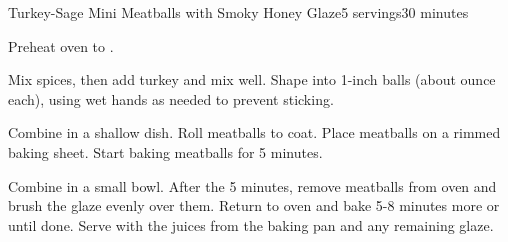 \documentclass[../Cookbook.tex]{subfiles}
\begin{document}
\begin{recipe}{Turkey-Sage Mini Meatballs with Smoky Honey Glaze}{5 servings}{30 minutes}

Preheat oven to .

Mix spices, then add turkey and mix well. Shape into 1-inch balls (about  ounce each), using wet hands as needed to prevent sticking.

Combine in a shallow dish. Roll meatballs to coat. Place meatballs on a rimmed baking sheet.
Start baking meatballs for 5 minutes.

Combine in a small bowl. After the 5 minutes, remove meatballs from oven and brush the glaze evenly over them. Return to oven and bake 5-8 minutes more or until done. Serve with the juices from the baking pan and any remaining glaze.

\end{recipe}
\end{document}

